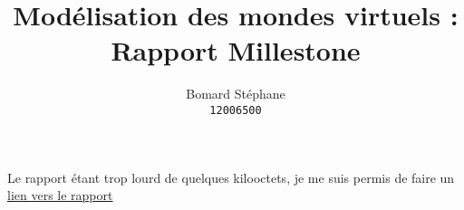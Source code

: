 \documentclass[11pt, letterpaper]{article}
\title{Modélisation des mondes virtuels : \\
    Rapport Millestone}
\author{Bomard Stéphane \\
        {\tt\small 12006500}}
\begin{document}
    \maketitle

    Le rapport étant trop lourd de quelques kilooctets,
    je me suis permis de faire un \href{https://filesender.renater.fr/?s=download&token=dbd7d7e3-5d35-48a4-ac7c-14a5c8a91899}{lien vers le rapport}
\end{document}
